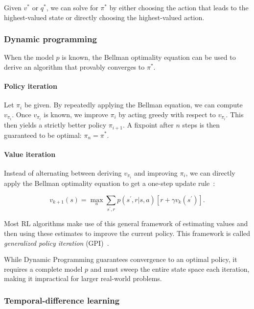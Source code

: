 Given $v^*$ or $q^*$, we can solve for $\pi^*$ by either choosing the action that leads
to the highest-valued state or directly choosing the highest-valued action.

\subsubsection{Dynamic programming}\label{sec:rl-dp}

When the model $p$ is known, the Bellman optimality equation can be used to derive an algorithm
that provably converges to $\pi^*$.

\paragraph{Policy iteration}
Let $\pi_i$ be given. By repeatedly applying the Bellman equation,
we can compute $v_{\pi_i}$. Once $v_{\pi_i}$ is known, we improve $\pi_i$ by acting greedy
with respect to $v_{\pi_i}$. This then yields a strictly better policy $\pi_{i+1}$.
A fixpoint after $n$ steps is then guaranteed to be optimal: $\pi_n=\pi^*$.

\paragraph{Value iteration}
Instead of alternating between deriving $v_{\pi_i}$ and improving $\pi_i$, we can directly
apply the Bellman optimality equation to get a one-step update rule~\cite{puterman_markov_2009}:

\begin{equation}\label{eq:value-iteration}
  v_{k+1}(s)=\max_a\sum_{s^\prime,r}p(s^\prime,r|s,a)\left[r+\gamma v_k(s^\prime)\right].
\end{equation}

Most RL algorithms make use of this general framework of estimating values and then
using these estimates to improve the current policy.
This framework is called \emph{generalized policy iteration} (GPI)~\cite{sutton_reinforcement_2020}.

While Dynamic Programming guarantees convergence to an optimal policy, it requires a complete model $p$ and
must sweep the entire state space each iteration, making it impractical for larger real-world problems.

\subsubsection{Temporal-difference learning}\label{sec:rl-td}

